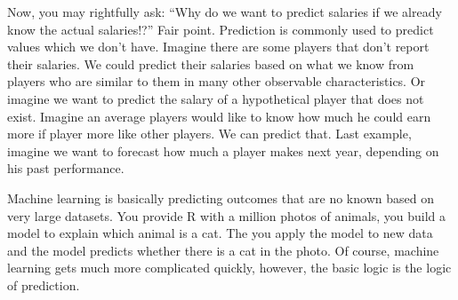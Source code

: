 \documentclass[
]{book}
\begin{document}
Now, you may rightfully ask: ``Why do we want to predict salaries if we already know the actual salaries!?'' Fair point. Prediction is commonly used to predict values which we don't have. Imagine there are some players that don't report their salaries. We could predict their salaries based on what we know from players who are similar to them in many other observable characteristics. Or imagine we want to predict the salary of a hypothetical player that does not exist. Imagine an average players would like to know how much he could earn more if player more like other players. We can predict that. Last example, imagine we want to forecast how much a player makes next year, depending on his past performance.

Machine learning is basically predicting outcomes that are no known based on very large datasets. You provide R with a million photos of animals, you build a model to explain which animal is a cat. The you apply the model to new data and the model predicts whether there is a cat in the photo. Of course, machine learning gets much more complicated quickly, however, the basic logic is the logic of prediction.
\end{document}
